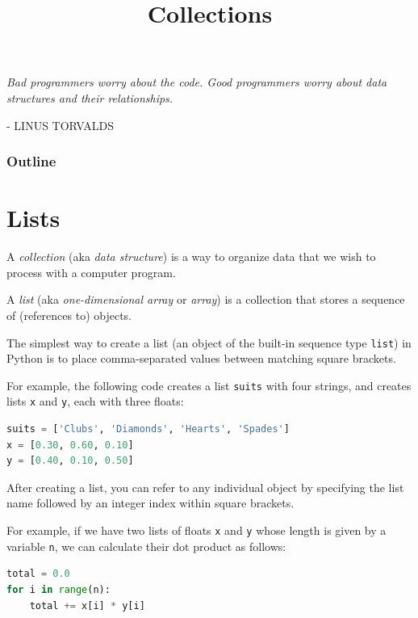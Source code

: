 \documentclass[8pt,a4paper,compress,handout]{beamer}
\title{Collections}
\date{}
\begin{document}
\begin{frame}
\hfill
\begin{minipage}{150pt}
\begin{flushright}
\tiny \emph{Bad programmers worry about the code. Good programmers worry about data structures and their relationships.} 

\smallskip

- LINUS TORVALDS
\end{flushright}
\end{minipage}
\vfill
\titlepage
\end{frame}

\begin{frame}
\frametitle{Outline}
\tableofcontents
\end{frame}

\section{Lists}
\begin{frame}[fragile]
A \emph{collection} (aka \emph{data structure}) is a way to organize data that we wish to process with a computer program.

\bigskip

A \emph{list} (aka \emph{one-dimensional array} or \emph{array}) is a collection that stores a sequence of (references to) objects.

\bigskip

The simplest way to create a list (an object of the built-in sequence type \lstinline{list}) in Python is to place comma-separated values between matching square brackets. 

\bigskip

For example, the following code creates a list \lstinline{suits} with four strings, and creates lists \lstinline{x} and \lstinline{y}, each with three floats:

\begin{lstlisting}[language=Python]
suits = ['Clubs', 'Diamonds', 'Hearts', 'Spades']
x = [0.30, 0.60, 0.10]
y = [0.40, 0.10, 0.50]
\end{lstlisting}

\bigskip

After creating a list, you can refer to any individual object by specifying the list name followed by an integer index within square brackets.

\bigskip

For example, if we have two lists of floats \lstinline{x} and \lstinline{y} whose length is given by a variable \lstinline{n}, we can calculate their dot product as follows:

\begin{lstlisting}[language=Python]
total = 0.0
for i in range(n):
    total += x[i] * y[i]
\end{lstlisting} 
\end{frame}
\end{document}
